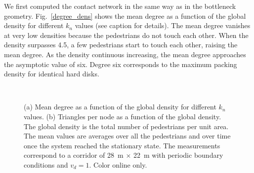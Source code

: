 \documentclass[preprint,12pt]{elsarticle}
\begin{document}
We first computed the contact network in the same way  as in the bottleneck
geometry. Fig.~\ref{degree_dens} shows the  mean degree as a function of the
global density for different $k_n$ values (see  caption for details). The mean
degree vanishes at very low  densities because the pedestrians do not touch each
other. When the density  surpasses 4.5, a few pedestrians start to touch each
other,  raising the mean degree. As the density continuous increasing,  the mean
degree approaches the asymptotic value  of six. Degree six corresponds to the
maximum packing density for identical hard disks.\\


\begin{figure}[!htbp]
\centering
    
\ 
\\
\caption[width=0.47\columnwidth]{(a) Mean degree as a function 
of the global density for different $k_n$ values. (b)  Triangles per node as a 
function of the global density. The global density is the total number of 
pedestrians per unit area. The mean values are averages over all the pedestrians 
and over time once the system reached the stationary state. The measurements 
correspond to a corridor of 28~m $\times$ 22~m with periodic boundary conditions 
and $v_d=1$. Color online only.}
\label{network_corridor}
\end{figure}
\end{document}
